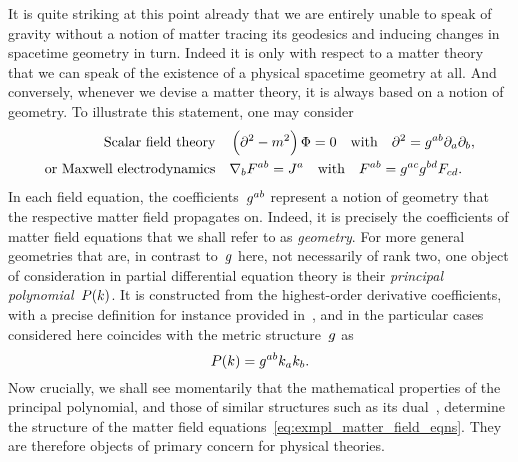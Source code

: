 It is quite striking at this point already that we are entirely unable to speak of gravity without a notion of matter tracing its geodesics and inducing changes in spacetime geometry in turn. Indeed it is only with respect to a matter theory that we can speak of the existence of a physical spacetime geometry at all. And conversely, whenever we devise a matter theory, it is always based on a notion of geometry. To illustrate this statement, one may consider
\begin{subequations}\label{eq:exmpl_matter_field_eqns}
\begin{align}
	\text{Scalar field theory} \quad &\left(\partial^2-m^2\right)\Phi=0 \quad \text{with} \quad \partial^2=g^{ab}\partial_a\partial_b\mathpunct{,}\label{eq:scal_dyn}\\
	\text{or Maxwell electrodynamics} \quad &\nabla_bF^{ab}=J^a \quad \text{with} \quad F^{ab}=g^{ac}g^{bd}F_{cd}\label{eq:mw_dyn}
	\mathpunct{.}
\end{align}
\end{subequations}
In each field equation, the coefficients~$g^{ab}$ represent a notion of geometry that the respective matter field propagates on. Indeed, it is precisely the coefficients of matter field equations that we shall refer to as \emph{geometry}. For more general geometries that are, in contrast to~$g$ here, not necessarily of rank two, one object of consideration in partial differential equation theory is their \emph{principal polynomial}~$P(k)$. It is constructed from the highest-order derivative coefficients, with a precise definition for instance provided in~\autocite{DispRel2011}, and in the particular cases considered here coincides with the metric structure~$g$ as
\begin{equation}
	P(k)=g^{ab}k_ak_b
	\mathpunct{.}
\end{equation}
Now crucially, we shall see momentarily that the mathematical properties of the principal polynomial, and those of similar structures such as its dual~\autocite{DispRel2011}, determine the structure of the matter field equations~\eqref{eq:exmpl_matter_field_eqns}. They are therefore objects of primary concern for physical theories.

